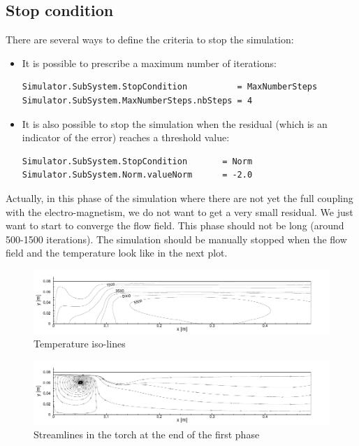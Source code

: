\documentclass[11pt]{article}
\begin{document}
\subsection{Stop condition}
There are several ways to define the criteria to stop the simulation:
\begin{itemize}
 \item It is possible to prescribe a maximum number of iterations:
\begin{verbatim} 
Simulator.SubSystem.StopCondition          = MaxNumberSteps
Simulator.SubSystem.MaxNumberSteps.nbSteps = 4
\end{verbatim}
\item It is also possible to stop the simulation when the residual (which is an indicator of the error)
reaches a threshold value:
\begin{verbatim}
Simulator.SubSystem.StopCondition       = Norm
Simulator.SubSystem.Norm.valueNorm      = -2.0
\end{verbatim}
\end{itemize}
Actually, in this phase of the simulation where there are not yet the full coupling with the electro-magnetism,
we do not want to get a very small residual. We just want to start to converge the flow field. This phase should not be long
(around 500-1500 iterations).
The simulation should be manually stopped when the flow field and the temperature look like in the next plot.
\begin{figure}[htbp]
 \includegraphics[width=\textwidth]{torch_T_nc.pdf}
\caption{Temperature iso-lines}\label{fig:}
\end{figure}
\begin{figure}[hbp]
 \includegraphics[width=\textwidth]{torch_SL_nc.pdf}
\caption{Streamlines in the torch at the end of the first phase}\label{fig:}
\end{figure}
\end{document}

